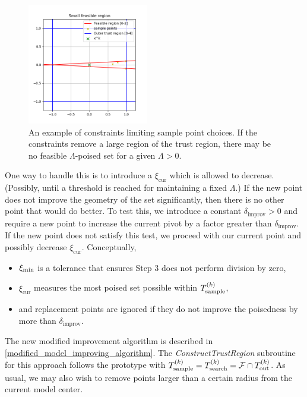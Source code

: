 \begin{figure}[ht]
    \centering
    \includegraphics[width=200px]{images/small_sample_region.png}
    \caption[An example of constraints limiting sample point choices.]
    	{An example of constraints limiting sample point choices.
    	If the constraints remove a large region of the trust region,
    	there may be no feasible $\Lambda$-poised set for a given $\Lambda>0$.
    }
    \label{lspc}
\end{figure}


One way to handle this is to introduce a $\xi_{\text{cur}}$ which is allowed to decrease.
(Possibly, until a threshold is reached for maintaining a fixed $\Lambda$.)
If the new point does not improve the geometry of the set significantly, then there is no other point that would do better.
To test this, we introduce a constant $\delta_{\text{improv}}>0$ and require a new point to increase the current pivot by a factor greater than $\delta_{\text{improv}}$.
If the new point does not satisfy this test, we proceed with our current point and possibly decrease $\xi_{\text{cur}}$.
Conceptually, 
\begin{itemize}
\item $\xi_{\text{min}}$ is a tolerance that ensures Step 3 does not perform division by zero,
\item $\xi_{\text{cur}}$ measures the most poised set possible within ${T_{\text{sample}}^{(k)}}$,
\item and replacement points are ignored if they do not improve the poisedness by more than $\delta_{\text{improv}}$.
\end{itemize}
The new modified improvement algorithm is described in \cref{modified_model_improving_algorithm}.
The \emph{ConstructTrustRegion} subroutine for this approach follows the prototype with ${T_{\text{sample}}^{(k)}} = {T_{\text{search}}^{(k)}} = {\mathcal F} \cap {T_{\text{out}}^{(k)}} $.
As usual, we may also wish to remove points larger than a certain radius from the current model center.

